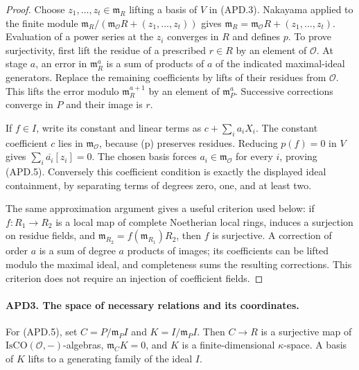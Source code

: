 \begin{proof}
Choose \(z_1,\ldots,z_t\in\mathfrak m_R\) lifting a basis
of \(V\) in (APD.3).  Nakayama applied to the finite module
\(\mathfrak m_R/(\mathfrak m_{\mathcal O}R+(z_1,\ldots,z_t))\)
gives
\(\mathfrak m_R=\mathfrak m_{\mathcal O}R+(z_1,\ldots,z_t)\).
Evaluation of a power series at the \(z_i\) converges in \(R\)
and defines \(p\).  To prove surjectivity, first lift the residue
of a prescribed \(r\in R\) by an element of \(\mathcal O\).
At stage \(a\), an error in \(\mathfrak m_R^a\) is a sum of
products of \(a\) of the indicated maximal-ideal generators.
Replace the remaining coefficients by lifts of their residues from
\(\mathcal O\).  This lifts the error modulo
\(\mathfrak m_R^{a+1}\) by an element of \(\mathfrak m_P^a\).
Successive corrections converge in \(P\) and their image is \(r\).

If \(f\in I\), write its constant and linear terms as
\(c+\sum_i a_iX_i\).  The constant coefficient \(c\) lies
in \(\mathfrak m_{\mathcal O}\), because (p) preserves
residues.  Reducing \(p(f)=0\) in \(V\) gives
\(\sum_i\overline{a_i}[z_i]=0\).  The chosen basis forces
\(a_i\in\mathfrak m_{\mathcal O}\) for every \(i\), proving
(APD.5).  Conversely this coefficient condition is exactly the
displayed ideal containment, by separating terms of degrees zero,
one, and at least two.

The same approximation argument gives a useful criterion used below:
if \(f:R_1\to R_2\) is a local map of complete Noetherian local
rings, induces a surjection on residue fields, and
\(\mathfrak m_{R_2}=f(\mathfrak m_{R_1})R_2\), then \(f\)
is surjective.  A correction of order \(a\) is a sum of degree
\(a\) products of images; its coefficients can be lifted modulo
the maximal ideal, and completeness sums the resulting corrections.
This criterion does not require an injection of coefficient fields.
\end{proof}

\paragraph{APD3. The space of necessary relations and its coordinates.}
\label{claim:APD3}
For (APD.5), set \(C=P/\mathfrak m_PI\) and
\(K=I/\mathfrak m_PI\).  Then \(C\to R\) is a surjective
map of \(\mathrm{IsCO}(\mathcal O,-)\)-algebras,
\(\mathfrak m_CK=0\), and \(K\) is a finite-dimensional
\(\kappa\)-space.  A basis of \(K\) lifts to a generating
family of the ideal \(I\).

